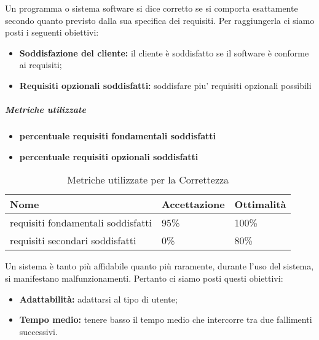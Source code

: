 Un programma o sistema software si dice corretto se si comporta esattamente secondo quanto previsto dalla sua specifica dei requisiti. Per raggiungerla ci siamo posti i seguenti obiettivi:
\begin{itemize}
	\item \textbf{Soddisfazione del cliente:} il cliente è soddisfatto se il software è conforme ai requisiti;
	\item \textbf{Requisiti opzionali soddisfatti:} soddisfare piu' requisiti opzionali possibili
\end{itemize}
\subparagraph{Metriche utilizzate}
\begin{itemize}
	\item \textbf{percentuale requisiti fondamentali soddisfatti}
	\item \textbf{percentuale requisiti opzionali soddisfatti}
\end{itemize}
\begin{table}[!htpb]
	\centering
	\renewcommand{\arraystretch}{2} 
		\begin{tabular}{|l|l|l|}
			\rowcolor{orange!50}
			\hline
			\textbf{Nome} & \textbf{Accettazione} & \textbf{Ottimalità} \\ \hline
			requisiti fondamentali soddisfatti  &  95\%  &  100\%      \\ \hline
			requisiti secondari soddisfatti  &   0\% &   80\%     \\ \hline
		\end{tabular}
	\caption{Metriche utilizzate per la Correttezza}
\end{table}
	Un sistema è tanto più affidabile quanto più raramente, durante l'uso del sistema, si manifestano malfunzionamenti. Pertanto ci siamo posti questi obiettivi:
	\begin{itemize}
	\item \textbf{Adattabilità:} adattarsi al tipo di utente;
	\item \textbf{Tempo medio:} tenere basso il tempo medio che intercorre tra due fallimenti successivi.
\end{itemize}

